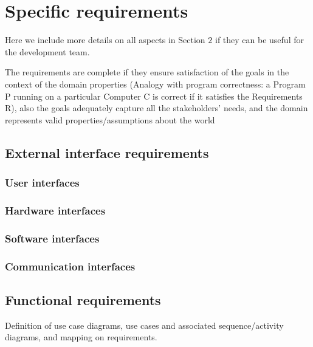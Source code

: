 \section{Specific requirements}
\label{sect:Specificrequirements}

Here we include more details on all aspects in Section $2$ if they can be useful for the development team. 

The requirements are complete if they ensure satisfaction of the goals in the context of the domain properties (Analogy with program correctness: a Program P running on a particular Computer C is correct if it satisfies the Requirements R), also the goals adequately capture all the stakeholders’ needs, and the domain represents valid properties/assumptions about the world

\subsection{External interface requirements}
\label{subsect:ecternalinterfacerequirements}

\subsubsection{User interfaces}
\label{subsubsect:userinterfaces}

\subsubsection{Hardware interfaces}
\label{subsubsect:hardwareinterfaces}

\subsubsection{Software interfaces}
\label{subsubsect:softwareinterfaces}

\subsubsection{Communication interfaces}
\label{subsubsect:communicationinterfaces}

\subsection{Functional requirements}
\label{subsect:functionalrequirements}

Definition of use case diagrams, use cases and associated sequence/activity diagrams, and mapping on requirements.

